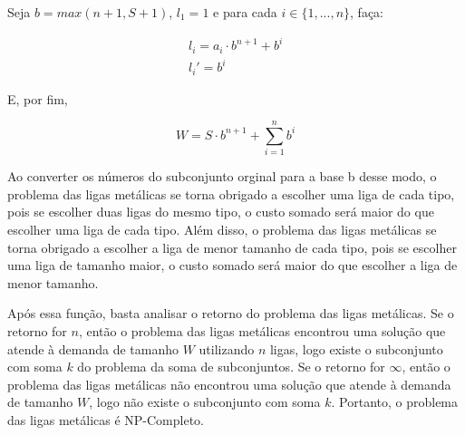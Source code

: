 \documentclass[12pt]{article}
\begin{document}
		\par Seja $b = max(n+1, S+1)$, $l_1 = 1$ e para cada $i \in \{1,...,n\}$, faça:
		
		\begin{equation}
			\begin{split}
				l_i = a_i \cdot b^{n+1} + b^i \\
				l_i' = b^i
			\end{split}
		\end{equation}

		\par E, por fim,

		\begin{equation}
			W = S \cdot b^{n+1} + \sum_{i=1}^{n} b^i
		\end{equation}

		\par Ao converter os números do subconjunto orginal para a base b desse modo, o problema das ligas metálicas se torna obrigado a escolher uma liga de cada tipo, pois se escolher duas ligas do mesmo tipo, o custo somado será maior do que escolher uma liga de cada tipo. Além disso, o problema das ligas metálicas se torna obrigado a escolher a liga de menor tamanho de cada tipo, pois se escolher uma liga de tamanho maior, o custo somado será maior do que escolher a liga de menor tamanho.

		\par Após essa função, basta analisar o retorno do problema das ligas metálicas. Se o retorno for $n$, então o problema das ligas metálicas encontrou uma solução que atende à demanda de tamanho $W$ utilizando $n$ ligas, logo existe o subconjunto com soma $k$ do problema da soma de subconjuntos. Se o retorno for $\infty$, então o problema das ligas metálicas não encontrou uma solução que atende à demanda de tamanho $W$, logo não existe o subconjunto com soma $k$. Portanto, o problema das ligas metálicas é NP-Completo.
\end{document}
